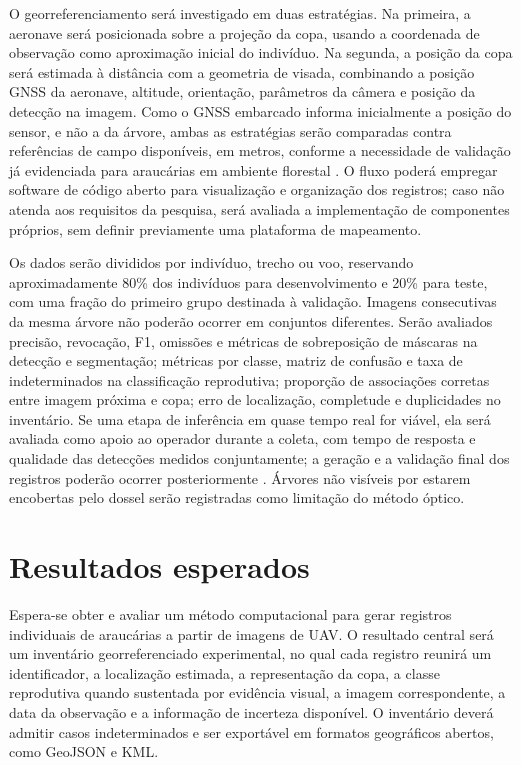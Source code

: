 O georreferenciamento será investigado em duas estratégias. Na primeira, a aeronave será posicionada sobre a projeção da copa, usando a coordenada de observação como aproximação inicial do indivíduo. Na segunda, a posição da copa será estimada à distância com a geometria de visada, combinando a posição GNSS da aeronave, altitude, orientação, parâmetros da câmera e posição da detecção na imagem. Como o GNSS embarcado informa inicialmente a posição do sensor, e não a da árvore, ambas as estratégias serão comparadas contra referências de campo disponíveis, em metros, conforme a necessidade de validação já evidenciada para araucárias em ambiente florestal \citep{venancio2010}. O fluxo poderá empregar software de código aberto para visualização e organização dos registros; caso não atenda aos requisitos da pesquisa, será avaliada a implementação de componentes próprios, sem definir previamente uma plataforma de mapeamento.

Os dados serão divididos por indivíduo, trecho ou voo, reservando aproximadamente 80\% dos indivíduos para desenvolvimento e 20\% para teste, com uma fração do primeiro grupo destinada à validação. Imagens consecutivas da mesma árvore não poderão ocorrer em conjuntos diferentes. Serão avaliados precisão, revocação, F1, omissões e métricas de sobreposição de máscaras na detecção e segmentação; métricas por classe, matriz de confusão e taxa de indeterminados na classificação reprodutiva; proporção de associações corretas entre imagem próxima e copa; erro de localização, completude e duplicidades no inventário. Se uma etapa de inferência em quase tempo real for viável, ela será avaliada como apoio ao operador durante a coleta, com tempo de resposta e qualidade das detecções medidos conjuntamente; a geração e a validação final dos registros poderão ocorrer posteriormente \citep{lago2024}. Árvores não visíveis por estarem encobertas pelo dossel serão registradas como limitação do método óptico.

\section{Resultados esperados}

Espera-se obter e avaliar um método computacional para gerar registros individuais de araucárias a partir de imagens de UAV. O resultado central será um inventário georreferenciado experimental, no qual cada registro reunirá um identificador, a localização estimada, a representação da copa, a classe reprodutiva quando sustentada por evidência visual, a imagem correspondente, a data da observação e a informação de incerteza disponível. O inventário deverá admitir casos indeterminados e ser exportável em formatos geográficos abertos, como GeoJSON e KML.

